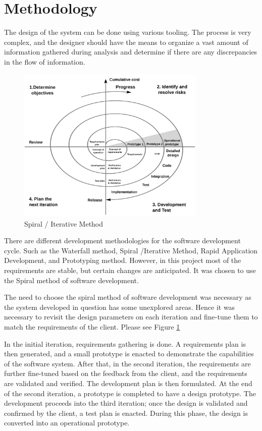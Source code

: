 \documentclass[12pt,a4paper]{report}
\begin{document}
\section{Methodology}

The design of the system can be done using various tooling. The process is very complex, and the designer should have the means to organize a vast amount of information gathered during analysis and determine if there are any discrepancies in the flow of information. 

\begin{figure}[h]
\begin{center}
\includegraphics[width=0.8\textwidth]{images/spiral.png}	
\end{center}
\caption{Spiral / Iterative Method}
\label{fig:spiral}
\end{figure}

There are different development methodologies for the software development cycle. Such as the Waterfall method, Spiral /Iterative Method, Rapid Application Development, and Prototyping method. However, in this project most of the requirements are stable, but certain changes are anticipated. It was chosen to use the Spiral method of software development.

The need to choose the spiral method of software development was necessary as the system developed in question has some unexplored areas. Hence it was necessary to revisit the design parameters on each iteration and fine-tune them to match the requirements of the client. Please see Figure \ref{fig:spiral}

In the initial iteration, requirements gathering is done. A requirements plan is then generated, and a small prototype is enacted to demonstrate the capabilities of the software system. After that, in the second iteration, the requirements are further fine-tuned based on the feedback from the client, and the requirements are validated and verified. The development plan is then formulated. At the end of the second iteration, a prototype is completed to have a design prototype. The development proceeds into the third iteration; once the design is validated and confirmed by the client, a test plan is enacted. During this phase, the design is converted into an operational prototype.
\end{document}
